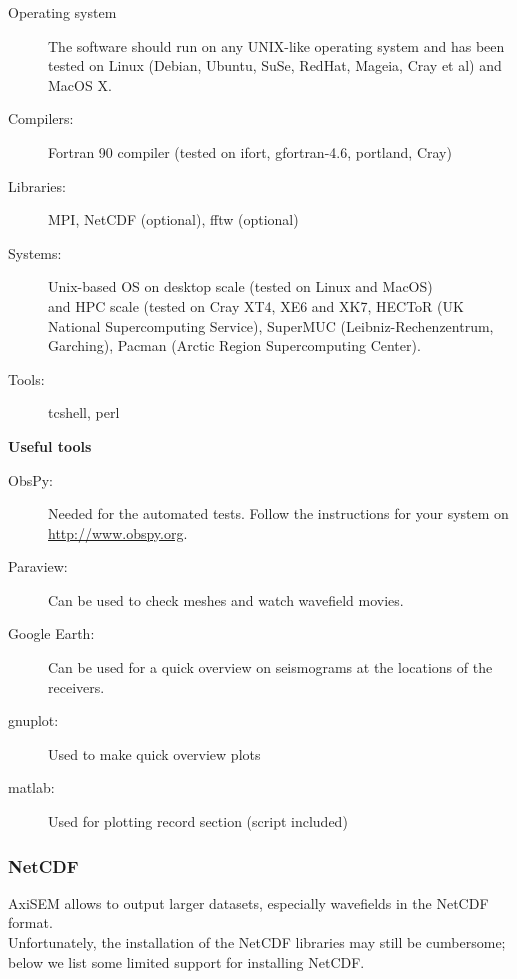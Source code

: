 \documentclass{article}
\begin{document}
\begin{description}
    \item[Operating system] The software should run on any UNIX-like operating system and has
          been tested on Linux (Debian, Ubuntu, SuSe, RedHat, Mageia, Cray et al) and MacOS X. 
    \item[Compilers:] Fortran 90 compiler (tested on ifort, gfortran-4.6, portland, Cray)
    \item[Libraries:] MPI, NetCDF (optional), fftw (optional)
    \item[Systems:] Unix-based OS on desktop scale (tested on Linux and MacOS)\\ and HPC scale (tested on Cray XT4, XE6 and XK7, HECToR (UK National Supercomputing Service), SuperMUC (Leibniz-Rechenzentrum, Garching), Pacman (Arctic Region Supercomputing Center).
    \item[Tools:] tcshell, perl
\end{description}\vspace*{0.3cm}

\textbf{Useful tools}

\begin{description}
    \item[ObsPy:] Needed for the automated tests. Follow the instructions for your system
          on \url{http://www.obspy.org}.
    \item[Paraview:] Can be used to check meshes and watch wavefield movies.
    \item[Google Earth:] Can be used for a quick overview on seismograms at the locations
          of the receivers.
    \item[gnuplot:] Used to make quick overview plots
    \item[matlab:] Used for plotting record section (script included)
\end{description}


\subsubsection{NetCDF}
\label{sssec:netcdf}

AxiSEM allows to output larger datasets, especially wavefields in the NetCDF format. \\
Unfortunately, the installation of the NetCDF libraries may still be cumbersome; below we
list some limited support for installing NetCDF.
\end{document}
